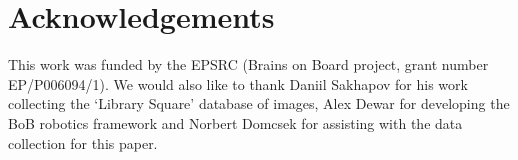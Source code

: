 \documentclass[letterpaper]{article}
\begin{document}
\section{Acknowledgements}
This work was funded by the EPSRC (Brains on Board project, grant number EP/P006094/1).
We would also like to thank Daniil Sakhapov for his work collecting the `Library Square' database of images, Alex Dewar for developing the BoB robotics framework and Norbert Domcsek for assisting with the data collection for this paper. 

\footnotesize

\end{document}
